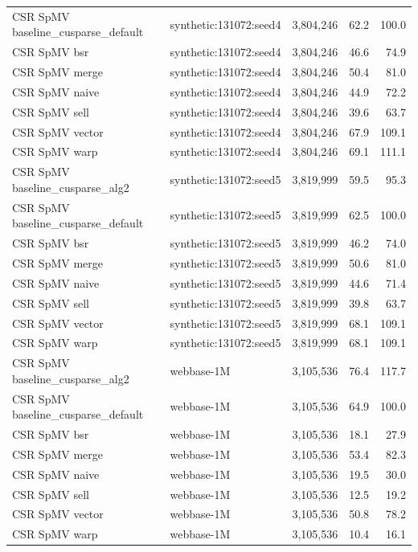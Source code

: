 \begin{tabular}{lllrr}
CSR SpMV baseline\_cusparse\_default & synthetic:131072:seed4 & 3,804,246 & 62.2 & 100.0 \\
CSR SpMV bsr & synthetic:131072:seed4 & 3,804,246 & 46.6 & 74.9 \\
CSR SpMV merge & synthetic:131072:seed4 & 3,804,246 & 50.4 & 81.0 \\
CSR SpMV naive & synthetic:131072:seed4 & 3,804,246 & 44.9 & 72.2 \\
CSR SpMV sell & synthetic:131072:seed4 & 3,804,246 & 39.6 & 63.7 \\
CSR SpMV vector & synthetic:131072:seed4 & 3,804,246 & 67.9 & 109.1 \\
CSR SpMV warp & synthetic:131072:seed4 & 3,804,246 & 69.1 & 111.1 \\
CSR SpMV baseline\_cusparse\_alg2 & synthetic:131072:seed5 & 3,819,999 & 59.5 & 95.3 \\
CSR SpMV baseline\_cusparse\_default & synthetic:131072:seed5 & 3,819,999 & 62.5 & 100.0 \\
CSR SpMV bsr & synthetic:131072:seed5 & 3,819,999 & 46.2 & 74.0 \\
CSR SpMV merge & synthetic:131072:seed5 & 3,819,999 & 50.6 & 81.0 \\
CSR SpMV naive & synthetic:131072:seed5 & 3,819,999 & 44.6 & 71.4 \\
CSR SpMV sell & synthetic:131072:seed5 & 3,819,999 & 39.8 & 63.7 \\
CSR SpMV vector & synthetic:131072:seed5 & 3,819,999 & 68.1 & 109.1 \\
CSR SpMV warp & synthetic:131072:seed5 & 3,819,999 & 68.1 & 109.1 \\
CSR SpMV baseline\_cusparse\_alg2 & webbase-1M & 3,105,536 & 76.4 & 117.7 \\
CSR SpMV baseline\_cusparse\_default & webbase-1M & 3,105,536 & 64.9 & 100.0 \\
CSR SpMV bsr & webbase-1M & 3,105,536 & 18.1 & 27.9 \\
CSR SpMV merge & webbase-1M & 3,105,536 & 53.4 & 82.3 \\
CSR SpMV naive & webbase-1M & 3,105,536 & 19.5 & 30.0 \\
CSR SpMV sell & webbase-1M & 3,105,536 & 12.5 & 19.2 \\
CSR SpMV vector & webbase-1M & 3,105,536 & 50.8 & 78.2 \\
CSR SpMV warp & webbase-1M & 3,105,536 & 10.4 & 16.1 \\
\bottomrule
\end{tabular}
